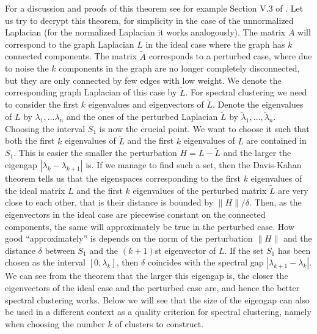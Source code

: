 \documentclass{article}
\newcommand{\norm}[1][\cdot]{\|#1\|}
\newcommand{\Lun}{L}
\begin{document}
For a discussion and proofs of this theorem see for example Section V.3
of .  Let us try to decrypt this theorem, for
simplicity in the case of the unnormalized Laplacian (for the
normalized Laplacian it works analogously). The matrix $A$ will
correspond to the graph Laplacian $L$ in the ideal case where the
graph has $k$ connected components. The matrix $\tilde A$ corresponds
to a perturbed case, where due to noise the $k$ components in the
graph are no longer completely disconnected, but they are only
connected by few edges with low weight. We denote the corresponding
graph Laplacian of this case by $\tilde \Lun$. For spectral clustering
we need to consider the first $k$ eigenvalues and eigenvectors of
$\tilde \Lun$. Denote the eigenvalues of $\Lun$ by $\lambda_1, \hdots
\lambda_n$ and the ones of the perturbed Laplacian $\tilde \Lun$ by
$\tilde \lambda_1,\hdots, \tilde \lambda_n$.  Choosing the interval
$S_1$ is now the crucial point. We want to choose it such that both
the first $k$ eigenvalues of $\tilde \Lun$ and the first $k$
eigenvalues of $\Lun$ are contained in $S_1$. This is easier the
smaller the perturbation $H = \Lun - \tilde \Lun$ and the larger the
eigengap $|\lambda_k - \lambda_{k+1}|$ is. If we manage to find such a
set, then the Davis-Kahan theorem tells us that the eigenspaces
corresponding to the first $k$ eigenvalues of the ideal matrix $\Lun$ and
the first $k$ eigenvalues of the perturbed matrix $\tilde \Lun$ are very
close to each other, that is their distance is bounded by
$\norm[H]/\delta$. Then, as the eigenvectors in the ideal case are
piecewise constant on the connected components, the same will
approximately be true in the perturbed case. How good
``approximately'' is depends on the norm of the perturbation
$\norm[H]$ and the distance $\delta$ between $S_1$ and the $(k+1)$st
eigenvector of $\Lun$.  If the set $S_1$ has been chosen as the
interval $[0,\lambda_k]$, then $\delta$ coincides with the spectral
gap $|\lambda_{k+1} - \lambda_k|$. We can see from the theorem that
the larger this eigengap is, the closer the eigenvectors of the ideal
case and the perturbed case are, and hence the better spectral
clustering works.  Below we will see that the size of the eigengap can
also be used in a different context as a quality criterion for
spectral clustering, namely when choosing the number $k$ of clusters
to construct.\\
\end{document}
